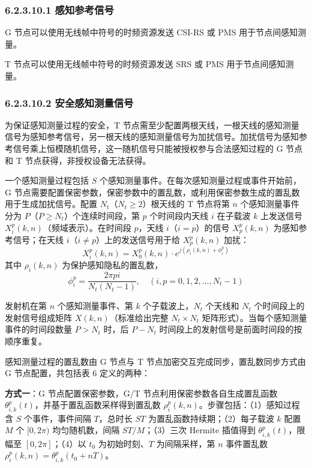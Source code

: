 \documentclass[11pt,a4paper]{ctexart}
\begin{document}
\subsubsection{6.2.3.10.1 感知参考信号}

G 节点可以使用无线帧中符号的时频资源发送 CSI-RS 或 PMS 用于节点间感知测量。

T 节点可以使用无线帧中符号的时频资源发送 SRS 或 PMS 用于节点间感知测量。

\subsubsection{6.2.3.10.2 安全感知测量信号}

为保证感知测量过程的安全，T 节点需至少配置两根天线，一根天线的感知测量信号为感知参考信号，另一根天线的感知测量信号为加扰信号。加扰信号为感知参考信号乘上恒模随机信号，这一随机信号只能被授权参与合法感知过程的 G 节点和 T 节点获得，非授权设备无法获得。

一个感知测量过程包括 $S$ 个感知测量事件。在每次感知测量过程或事件开始前，G 节点需要配置保密参数，保密参数中的置乱数，或利用保密参数生成的置乱数用于生成加扰信号。配置 $N_t$（$N_t \geq 2$）根天线的 T 节点将第 $n$ 个感知测量事件分为 $P$（$P \geq N_t$）个连续时间段，第 $p$ 个时间段内天线 $i$ 在子载波 $k$ 上发送信号 $X_i^p(k,n)$（频域表示）。在时间段 $p$，天线 $i$（$i = p$）的信号 $X_p^p(k,n)$ 为感知参考信号；在天线 $i$（$i \neq p$）上的发送信号用于给 $X_p^p(k,n)$ 加扰：
\begin{equation}
X_i^p(k,n) = X_0^p(k,n) \cdot e^{j(\rho_i(k,n) + \phi_i^p)}
\end{equation}
其中 $\rho_i(k,n)$ 为保护感知隐私的置乱数，
\begin{equation}
\phi_i^p = \frac{2\pi p i}{N_t (N_t - 1)}, \quad (i, p = 0, 1, 2, \ldots, N_t - 1)
\end{equation}

发射机在第 $n$ 个感知测量事件、第 $k$ 个子载波上，$N_t$ 个天线和 $N_t$ 个时间段上的发射信号组成矩阵 $X(k,n)$（标准给出完整 $N_t \times N_t$ 矩阵形式）。当每个感知测量事件的时间段数量 $P > N_t$ 时，后 $P - N_t$ 时间段上的发射信号是前面时间段的按顺序重复。

感知测量过程的置乱数由 G 节点与 T 节点加密交互完成同步，置乱数同步方式由 G 节点配置，共包括表 6 定义的两种：

\textbf{方式一}：G 节点配置保密参数，G/T 节点利用保密参数各自生成置乱函数 $\theta_{i,k}^p(t)$，并基于置乱函数采样得到置乱数 $\rho_i^p(k,n)$。步骤包括：（1）感知过程含 $S$ 个事件，事件间隔 $T$，总时长 $ST$ 为置乱函数持续期；（2）每子载波 $k$ 配置 $M$ 个 $[0, 2\pi)$ 均匀随机数，间隔 $ST/M$；（3）三次 Hermite 插值得到 $\theta_{i,k}^p(t)$，限幅至 $[0, 2\pi]$；（4）以 $t_0$ 为初始时刻、$T$ 为间隔采样，第 $n$ 事件置乱数 $\rho_i^p(k,n) = \theta_{i,k}^p(t_0 + nT)$。
\end{document}

